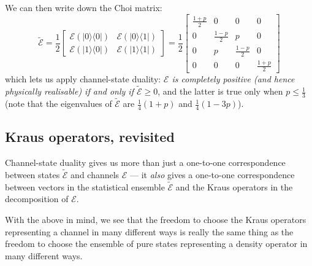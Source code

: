 \documentclass[fleqn]{article}
\newenvironment{idea}{\noindent}{\medskip}
\begin{document}
We can then write down the Choi matrix:
\[
  \widetilde{\mathcal{E}}
  = \frac{1}{2}
  \begin{bmatrix}
    \mathcal{E}(|0\rangle\langle 0|)
    & \mathcal{E}(|0\rangle\langle 1|)
  \\\mathcal{E}(|1\rangle\langle 0|)
    & \mathcal{E}(|1\rangle\langle 1|)
  \end{bmatrix}
  = \frac{1}{2}
  \left[
    \begin{array}{cc|cc}
    \frac{1+p}{2} & 0 & 0 & 0
  \\0 & \frac{1-p}{2} & p & 0
  \\\hline
    0 & p & \frac{1-p}{2} & 0
  \\0 & 0 & 0 & \frac{1+p}{2}
   \end{array}
  \right]
\]
which lets us apply channel-state duality: \emph{\(\mathcal{E}\) is completely positive (and hence physically realisable) if and only if \(\widetilde{\mathcal{E}}\geqslant 0\)}, and the latter is true only when \(p\leqslant\frac13\) (note that the eigenvalues of \(\widetilde{\mathcal{E}}\) are \(\frac{1}{4}(1+p)\) and \(\frac{1}{4}(1-3p)\)).

\hypertarget{kraus-operators-revisited}{%
\subsection{Kraus operators, revisited}\label{kraus-operators-revisited}}

\begin{idea}
Channel-state duality gives us more than just a one-to-one correspondence between states \(\widetilde{\mathcal{E}}\) and channels \(\mathcal{E}\) --- it \emph{also} gives a one-to-one correspondence between vectors in the statistical ensemble \(\widetilde{\mathcal{E}}\) and the Kraus operators in the decomposition of \(\mathcal{E}\).

\end{idea}

With the above in mind, we see that the freedom to choose the Kraus operators representing a channel in many different ways is really the same thing as the freedom to choose the ensemble of pure states representing a density operator in many different ways.
\end{document}
